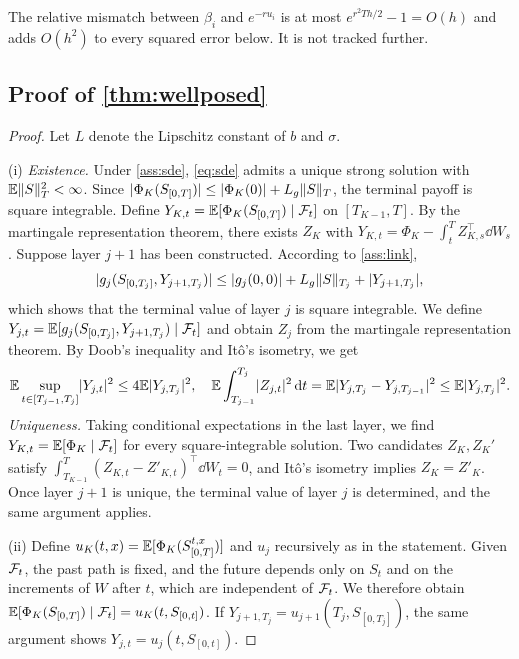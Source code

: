 The relative mismatch between $\beta_i$ and $e^{-ru_i}$ is at most $e^{r^2Th/2}-1=O(h)$ and adds $O(h^2)$ to every squared error below. It is not tracked further.

\subsection{Proof of \texorpdfstring{\cref{thm:wellposed}}{Theorem 1}}\label{app:wellposed}

\begin{proof}

Let $L$ denote the Lipschitz constant of $b$ and $\sigma$.

(i) \emph{Existence.} Under \cref{ass:sde}, \eqref{eq:sde} admits a unique strong solution with $\mathbb{E}\lVert S\rVert_T^2<\infty$. Since $\lvert \Phi_K(S_{[0,T]})\rvert\le\lvert \Phi_K(0)\rvert+L_g\lVert S\rVert_T$, the terminal payoff is square integrable. Define $Y_{K,t}=\mathbb{E}[\Phi_K(S_{[0,T]})\mid\mathcal{F}_t]$ on $[T_{K-1},T]$. By the martingale representation theorem, there exists $Z_K$ with $Y_{K,t}=\Phi_K-\int_t^TZ_{K,s}^\top\dd W_s$. Suppose layer $j+1$ has been constructed. According to \cref{ass:link},
\[
\lvert g_j(S_{[0,T_j]},Y_{j+1,T_j})\rvert\le\lvert g_j(0,0)\rvert+L_g\lVert S\rVert_{T_j}+\lvert Y_{j+1,T_j}\rvert,
\]
which shows that the terminal value of layer $j$ is square integrable. We define $Y_{j,t}=\mathbb{E}[g_j(S_{[0,T_j]},Y_{j+1,T_j})\mid\mathcal{F}_t]$ and obtain $Z_j$ from the martingale representation theorem. By Doob's inequality and It\^o's isometry, we get
\[
\mathbb{E}\sup_{t\in[T_{j-1},T_j]}\lvert Y_{j,t}\rvert^2\le4\mathbb{E}\lvert Y_{j,T_j}\rvert^2,\quad
\mathbb{E}\int_{T_{j-1}}^{T_j}\lvert Z_{j,t}\rvert^2\,\mathrm{d} t=\mathbb{E}\lvert Y_{j,T_j}-Y_{j,T_{j-1}}\rvert^2\le\mathbb{E}\lvert Y_{j,T_j}\rvert^2 .
\]
\emph{Uniqueness.} Taking conditional expectations in the last layer, we find $Y_{K,t}=\mathbb{E}[\Phi_K\mid\mathcal{F}_t]$ for every square-integrable solution. Two candidates $Z_K,Z_K'$ satisfy $\int_{T_{K-1}}^T(Z_{K,t}-Z'_{K,t})^\top\dd W_t=0$, and It\^o's isometry implies $Z_K=Z'_K$. Once layer $j+1$ is unique, the terminal value of layer $j$ is determined, and the same argument applies.

(ii) Define $u_K(t,x)=\mathbb{E}[\Phi_K(S^{t,x}_{[0,T]})]$ and $u_j$ recursively as in the statement. Given $\mathcal{F}_t$, the past path is fixed, and the future depends only on $S_t$ and on the increments of $W$ after $t$, which are independent of $\mathcal{F}_t$. We therefore obtain $\mathbb{E}[\Phi_K(S_{[0,T]})\mid\mathcal{F}_t]=u_K(t,S_{[0,t]})$. If $Y_{j+1,T_j}=u_{j+1}(T_j,S_{[0,T_j]})$, the same argument shows $Y_{j,t}=u_j(t,S_{[0,t]})$.


\end{proof}
